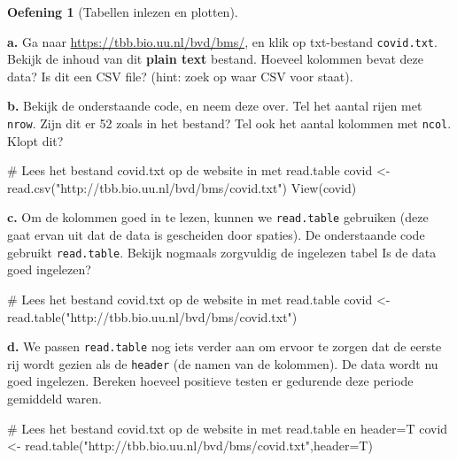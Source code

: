 \documentclass[
  a4paper,
]{scrbook}
\newenvironment{Shaded}{\begin{snugshade}}{\end{snugshade}}
\newcommand{\AttributeTok}[1]{\textcolor[rgb]{0.40,0.45,0.13}{#1}}
\newcommand{\CommentTok}[1]{\textcolor[rgb]{0.37,0.37,0.37}{#1}}
\newcommand{\FunctionTok}[1]{\textcolor[rgb]{0.28,0.35,0.67}{#1}}
\newcommand{\NormalTok}[1]{\textcolor[rgb]{0.00,0.23,0.31}{#1}}
\newcommand{\OtherTok}[1]{\textcolor[rgb]{0.00,0.23,0.31}{#1}}
\newcommand{\StringTok}[1]{\textcolor[rgb]{0.13,0.47,0.30}{#1}}
\theoremstyle{definition}
\newtheorem{exercise}{Oefening}[chapter]
\theoremstyle{remark}
\begin{document}
\begin{exercise}[Tabellen inlezen en
plotten]\protect\hypertarget{exr-R-3}{}\label{exr-R-3}

\textbf{a.} Ga naar \url{https://tbb.bio.uu.nl/bvd/bms/}, en klik op
txt-bestand \texttt{covid.txt}. Bekijk de inhoud van dit \textbf{plain
text} bestand. Hoeveel kolommen bevat deze data? Is dit een CSV file?
(hint: zoek op waar CSV voor staat).

\textbf{b.} Bekijk de onderstaande code, en neem deze over. Tel het
aantal rijen met \texttt{nrow}. Zijn dit er 52 zoals in het bestand? Tel
ook het aantal kolommen met \texttt{ncol}. Klopt dit?

\begin{Shaded}
\begin{Highlighting}[]
\CommentTok{\# Lees het bestand covid.txt op de website in met \textquotesingle{}read.table\textquotesingle{}}
\NormalTok{covid }\OtherTok{\textless{}{-}} \FunctionTok{read.csv}\NormalTok{(}\StringTok{"http://tbb.bio.uu.nl/bvd/bms/covid.txt"}\NormalTok{)}
\FunctionTok{View}\NormalTok{(covid)}
\end{Highlighting}
\end{Shaded}

\textbf{c.} Om de kolommen goed in te lezen, kunnen we
\texttt{read.table} gebruiken (deze gaat ervan uit dat de data is
gescheiden door spaties). De onderstaande code gebruikt
\texttt{read.table}. Bekijk nogmaals zorgvuldig de ingelezen tabel Is de
data goed ingelezen?

\begin{Shaded}
\begin{Highlighting}[]
\CommentTok{\# Lees het bestand covid.txt op de website in met \textquotesingle{}read.table\textquotesingle{}}
\NormalTok{covid }\OtherTok{\textless{}{-}} \FunctionTok{read.table}\NormalTok{(}\StringTok{"http://tbb.bio.uu.nl/bvd/bms/covid.txt"}\NormalTok{)}
\end{Highlighting}
\end{Shaded}

\textbf{d.} We passen \texttt{read.table} nog iets verder aan om ervoor
te zorgen dat de eerste rij wordt gezien als de \texttt{header} (de
namen van de kolommen). De data wordt nu goed ingelezen. Bereken hoeveel
positieve testen er gedurende deze periode gemiddeld waren.

\begin{Shaded}
\begin{Highlighting}[]
\CommentTok{\# Lees het bestand covid.txt op de website in met \textquotesingle{}read.table\textquotesingle{} en header=T}
\NormalTok{covid }\OtherTok{\textless{}{-}} \FunctionTok{read.table}\NormalTok{(}\StringTok{"http://tbb.bio.uu.nl/bvd/bms/covid.txt"}\NormalTok{,}\AttributeTok{header=}\NormalTok{T)}
\end{Highlighting}
\end{Shaded}


\end{exercise}
\end{document}
